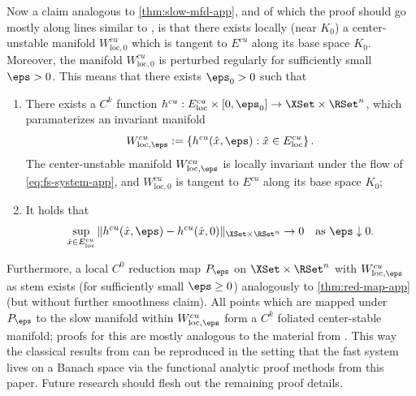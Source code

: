 \documentclass[a4paper]{siamart190516}
\begin{document}
Now a claim analogous to \cref{thm:slow-mfd-app}, and of which the proof should go mostly along lines similar to , is that there exists locally (near $K_0$) a center-unstable manifold $W^{cu}_{\text{loc},0}$ which is tangent to $E^{cu}$ along its base space $K_0$. Moreover, the manifold $W^{cu}_{\text{loc},0}$ is perturbed regularly for sufficiently small $\eps > 0$. This means that there exists $\eps_0 > 0$ such that
\begin{enumerate}
\item There exists a $C^k$ function $h^{cu}: E^{cu}_{\text{loc}} \times [0,\eps_0] \rightarrow \XSet \times \RSet^n$, which paramaterizes an invariant manifold
\[
W_{\text{loc},\eps}^{cu} := \left \{ h^{cu}(\hat{x}, \eps) : \hat{x} \in E^{cu}_{\text{loc}}      \right \}.
\]
The center-unstable manifold $W_{\text{loc},\eps}^{cu}$ is locally invariant under the flow of \cref{eq:fs-system-app}, and $W_{\text{loc},0}^{cu}$ is tangent to $E^{cu}$ along its base space $K_0$;
\item It holds that 
\[
\sup_{\hat{x} \in E^{cu}_{\text{loc}}}  \| h^{cu}(\hat{x},\eps) - h^{cu}(\hat{x},0) \|_{\XSet \times \RSet^n} \rightarrow 0 \quad \text{as } \eps \downarrow 0.
\]
\end{enumerate}

Furthermore, a local $C^0$ reduction map $P_{\eps}$ on $\XSet \times \RSet^n$ with $W_{\text{loc},\eps}^{cu}$ as stem exists (for sufficiently small $\eps \geq 0$) analogously to \cref{thm:red-map-app} (but without further smoothness claim). All points which are mapped under $P_{\eps}$ to the slow manifold within $W_{\text{loc},\eps}^{cu}$ form a $C^k$ foliated center-stable manifold; proofs for this are mostly analogous to the material from . This way the classical results from \cite{Fe79} can be reproduced in the setting that the fast system lives on a Banach space via the functional analytic proof methods from this paper. Future research should flesh out the remaining proof details.
\end{document}
